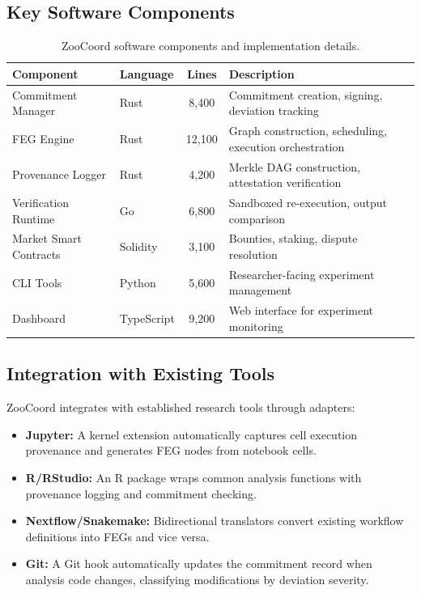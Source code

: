 \documentclass[11pt,a4paper]{article}
\begin{document}
\subsection{Key Software Components}

\begin{table}[H]
\centering
\caption{ZooCoord software components and implementation details.}
\label{tab:components}
\begin{tabularx}{\textwidth}{@{}llcX@{}}
\toprule
\textbf{Component} & \textbf{Language} & \textbf{Lines} & \textbf{Description} \\
\midrule
Commitment Manager & Rust & 8,400 & Commitment creation, signing, deviation tracking \\
FEG Engine & Rust & 12,100 & Graph construction, scheduling, execution orchestration \\
Provenance Logger & Rust & 4,200 & Merkle DAG construction, attestation verification \\
Verification Runtime & Go & 6,800 & Sandboxed re-execution, output comparison \\
Market Smart Contracts & Solidity & 3,100 & Bounties, staking, dispute resolution \\
CLI Tools & Python & 5,600 & Researcher-facing experiment management \\
Dashboard & TypeScript & 9,200 & Web interface for experiment monitoring \\
\bottomrule
\end{tabularx}
\end{table}

\subsection{Integration with Existing Tools}

ZooCoord integrates with established research tools through adapters:

\begin{itemize}[leftmargin=*]
    \item \textbf{Jupyter:} A kernel extension automatically captures cell execution provenance and generates FEG nodes from notebook cells.
    \item \textbf{R/RStudio:} An R package wraps common analysis functions with provenance logging and commitment checking.
    \item \textbf{Nextflow/Snakemake:} Bidirectional translators convert existing workflow definitions into FEGs and vice versa.
    \item \textbf{Git:} A Git hook automatically updates the commitment record when analysis code changes, classifying modifications by deviation severity.
\end{itemize}
\end{document}
